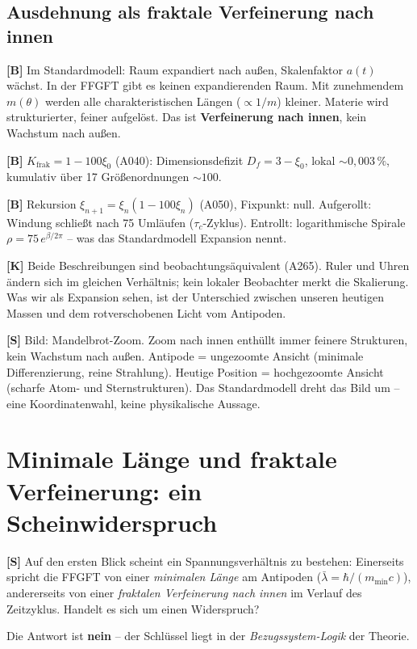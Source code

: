 \subsection{Ausdehnung als fraktale Verfeinerung nach innen}

\textbf{[B]} Im Standardmodell: Raum expandiert nach außen,
Skalenfaktor $a(t)$ wächst. In der FFGFT gibt es keinen expandierenden
Raum. Mit zunehmendem $m(\theta)$ werden alle charakteristischen
Längen ($\propto 1/m$) kleiner. Materie wird strukturierter, feiner
aufgelöst. Das ist \textbf{Verfeinerung nach innen}, kein Wachstum
nach außen.

\textbf{[B]} $K_\text{frak} = 1-100\xi_0$ (A040): Dimensionsdefizit
$D_f = 3-\xi_0$, lokal $\sim 0{,}003\,\%$, kumulativ über 17
Größenordnungen $\sim 100$.

\textbf{[B]} Rekursion $\xi_{n+1} = \xi_n(1-100\xi_n)$ (A050),
Fixpunkt: null. Aufgerollt: Windung schließt nach 75 Umläufen
($\tau_c$-Zyklus). Entrollt: logarithmische Spirale
$\rho = 75\,e^{\beta/2\pi}$ – was das Standardmodell Expansion nennt.

\textbf{[K]} Beide Beschreibungen sind beobachtungsäquivalent (A265).
Ruler und Uhren ändern sich im gleichen Verhältnis; kein lokaler
Beobachter merkt die Skalierung. Was wir als Expansion sehen, ist der
Unterschied zwischen unseren heutigen Massen und dem rotverschobenen
Licht vom Antipoden.

\textbf{[S]} Bild: Mandelbrot-Zoom. Zoom nach innen enthüllt immer
feinere Strukturen, kein Wachstum nach außen. Antipode = ungezoomte
Ansicht (minimale Differenzierung, reine Strahlung). Heutige Position
= hochgezoomte Ansicht (scharfe Atom- und Sternstrukturen).
Das Standardmodell dreht das Bild um – eine Koordinatenwahl,
keine physikalische Aussage.

\section{Minimale Länge und fraktale Verfeinerung: ein Scheinwiderspruch}

\textbf{[S]} Auf den ersten Blick scheint ein Spannungsverhältnis zu bestehen:
Einerseits spricht die FFGFT von einer \emph{minimalen Länge} am Antipoden
($\bar\lambda = \hbar/(m_\text{min} c)$), andererseits von einer
\emph{fraktalen Verfeinerung nach innen} im Verlauf des Zeitzyklus.
Handelt es sich um einen Widerspruch?

Die Antwort ist \textbf{nein} – der Schlüssel liegt in der
\emph{Bezugssystem-Logik} der Theorie.

